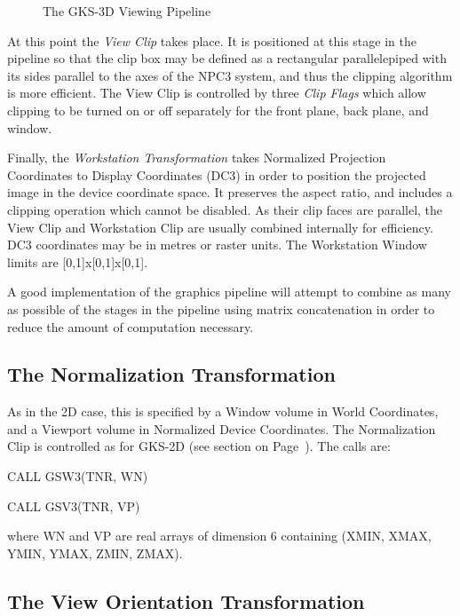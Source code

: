 \begin{OL}
\begin{figure}[h]
\caption{The GKS-3D Viewing Pipeline}
\label{fig:pipe}
\end{figure}
\item At this point the {\it View Clip} takes place.
It is positioned at this stage in the pipeline so that the clip box may be
defined as a rectangular parallelepiped with its sides parallel to
the axes of the NPC3 system, and thus the clipping algorithm is
more efficient. The View Clip is controlled by three {\it Clip Flags}
which allow clipping to be turned on or off separately for the
front plane, back plane, and window.
\item Finally, the {\it Workstation Transformation} takes
Normalized Projection Coordinates to Display Coordinates (DC3) in order
to position the projected image in the device coordinate space. It
preserves the aspect ratio, and includes a clipping operation which
cannot be disabled. As their clip faces are parallel, the View Clip and
Workstation Clip are usually combined internally for efficiency. DC3
coordinates may be in metres or raster units. The Workstation Window
limits are [0,1]x[0,1]x[0,1].
\end{OL}
 
A good implementation of the graphics pipeline will attempt to combine
as many as possible of the stages in the pipeline using matrix
concatenation in order to reduce the amount of computation necessary.
\subsection{The Normalization Transformation}
 
As in the 2D case, this is specified by a Window volume in World
Coordinates, and a Viewport volume in Normalized Device Coordinates.
The Normalization Clip is controlled as for GKS-2D
(see section on Page~\pageref{sec:nrmclp}).
The calls are:
\begin{XMP}
CALL GSW3(TNR, WN)
 
CALL GSV3(TNR, VP)
\end{XMP}
where WN and VP are real arrays of dimension 6 containing (XMIN,
XMAX, YMIN, YMAX, ZMIN, ZMAX).
\subsection{The View Orientation Transformation}
 
